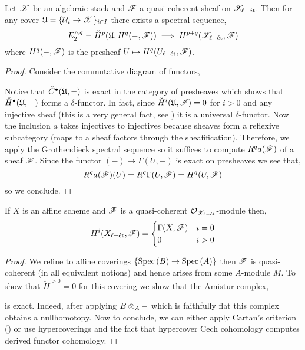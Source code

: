 \documentclass[12pt]{article}
\begin{document}
\begin{theorem}
Let $\mathscr{X}$ be an algebraic stack and $\mathscr{F}$ a quasi-coherent sheaf on $\mathscr{X}_{\ell-\text{\'{e}t}}$. Then for any cover $\mathfrak{U} = \{ \mathcal{U}_i \to \mathscr{X} \}_{i \in I}$ there exists a spectral sequence,
\[ E^{p,q}_2 = \check{H}^p(\mathfrak{U}, H^q(-,\mathscr{F})) \implies H^{p+q}(\mathscr{X}_{\ell-\text{\'{e}t}}, \mathscr{F}) \]
where $H^q(-,\mathscr{F})$ is the presheaf $U \mapsto H^q(U_{\ell-\text{\'{e}t}}, \mathscr{F})$. 
\end{theorem}

\begin{proof}
Consider the commutative diagram of functors,
\begin{center}
\end{center}
Notice that $\check{C}^\bullet(\mathfrak{U}, -)$ is exact in the category of presheaves which shows that $\check{H}^\bullet(\mathfrak{U}, -)$ forms a $\delta$-functor. In fact, since $\check{H}^i(\mathfrak{U}, \mathscr{I}) = 0$ for $i > 0$ and any injective sheaf (this is a very general fact, see ) it is a universal $\delta$-functor. Now the inclusion $a$ takes injectives to injectives because sheaves form a reflexive subcategory (maps to a sheaf factors through the sheafification). Therefore, we apply the Grothendieck spectral sequence so it suffices to compute $R^q a(\mathscr{F})$ of a sheaf $\mathscr{F}$. Since the functor $(-) \mapsto \Gamma(U, -)$ is exact on presheaves we see that,
\[ R^q a(\mathscr{F})(U) = R^q \Gamma(U, \mathscr{F}) = H^q(U, \mathscr{F}) \]
so we conclude.
\end{proof}

\begin{theorem}
If $X$ is an affine scheme and $\mathscr{F}$ is a quasi-coherent $\mathcal{O}_{\mathscr{X}_{\ell-\text{\'{e}t}}}$-module then,
\[ H^i(X_{\ell-\text{\'{e}t}}, \mathscr{F}) = 
\begin{cases}
\Gamma(X, \mathscr{F}) & i = 0
\\
0 & i > 0
\end{cases} \]
\end{theorem}

\begin{proof}
We refine to affine coverings $\{ \mathrm{Spec}\left( B \right) \to \mathrm{Spec}\left( A \right) \}$ then $\mathscr{F}$ is quasi-coherent (in all equivalent notions) and hence arises from some $A$-module $M$. To show that $\check{H}^{>0} = 0$ for this covering we show that the Amistur complex,
\begin{center}
\end{center}
is exact. Indeed, after applying $B \otimes_A -$ which is faithfully flat this complex obtains a nullhomotopy. Now to conclude, we can either apply Cartan's criterion () or use hypercoverings and the fact that hypercover Cech cohomology computes derived functor cohomology.
\end{proof}
\end{document}
